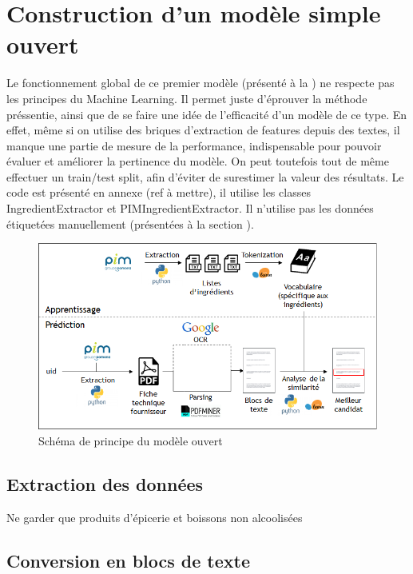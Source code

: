     \chapter{Construction d'un modèle simple \og ouvert \fg}
        
    Le fonctionnement global de ce premier modèle (présenté à la ) ne respecte pas les principes du Machine Learning.
    Il permet juste d'éprouver la méthode préssentie, ainsi que de se faire une idée de l'efficacité d'un modèle de ce type.
    En effet, même si on utilise des briques d'extraction de features depuis des textes, il manque une partie de mesure de la performance, indispensable pour pouvoir évaluer et améliorer la pertinence du modèle.
    On peut toutefois tout de même effectuer un train/test split, afin d'éviter de surestimer la valeur des résultats.    
    Le code est présenté en annexe (ref à mettre), il utilise les classes IngredientExtractor et PIMIngredientExtractor.
    Il n'utilise pas les données étiquetées manuellement (présentées à la section ).

    \begin{figure}[htbp]
        \begin{center}
        \includegraphics[width=0.9\linewidth]{img/open_model.png}
        \end{center}
        \caption{Schéma de principe du \og modèle ouvert \fg}
        \label{fig:open_model}
    \end{figure}     


        \section{Extraction des données}

        Ne garder que produits d'épicerie et boissons non alcoolisées

        \section{Conversion en blocs de texte}


